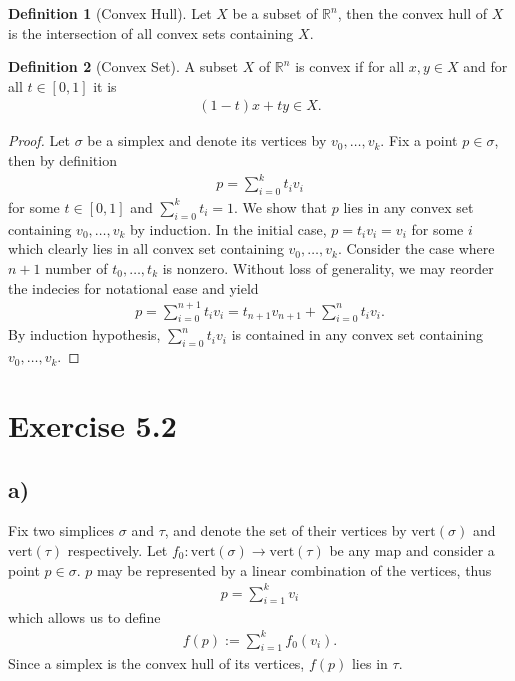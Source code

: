 \documentclass[a4paper]{book}
\theoremstyle{definition}
\newtheorem{definition}{Definition}[]
\begin{document}
\begin{definition}[Convex Hull]
    Let \(X\) be a subset of \(\mathbb{R}^n\), then the convex hull of \(X\) is the intersection of all convex sets containing \(X\).
\end{definition}

\begin{definition}[Convex Set]
    A subset \(X\) of \(\mathbb{R}^n\) is convex if for all \(x, y \in X\) and for all \(t \in [0, 1]\) it is
    \begin{align*}
        (1 - t)x + ty \in X \text{.}
    \end{align*}
\end{definition}

\begin{proof}
    Let \(\sigma\) be a simplex and denote its vertices by \(v_0, \ldots, v_k\). Fix a point \(p \in \sigma\), then by definition
    \begin{align*}
        p = \sum_{i=0}^k t_i v_i
    \end{align*}
    for some \(t \in [0, 1]\) and \(\sum_{i=0}^k t_i = 1\). We show that \(p\) lies in any convex set containing \(v_0, \ldots, v_k\) by induction. In the initial case, \(p = t_i v_i = v_i\) for some \(i\) which clearly lies in all convex set containing \(v_0, \ldots, v_k\). Consider the case where \(n + 1\) number of \(t_0, \ldots, t_k\) is nonzero. Without loss of generality, we may reorder the indecies for notational ease and yield
    \begin{align*}
        p = \sum_{i=0}^{n+1} t_i v_i = t_{n+1} v_{n+1} + \sum_{i=0}^{n} t_i v_i \text{.}
    \end{align*}
    By induction hypothesis, \(\sum_{i=0}^{n} t_i v_i\) is contained in any convex set containing \(v_0, \ldots, v_k\).
\end{proof}

\section*{Exercise 5.2}
\subsection*{a)}

Fix two simplices \(\sigma\) and \(\tau\), and denote the set of their vertices by \(\mathrm{vert}(\sigma)\) and \(\mathrm{vert}(\tau)\) respectively. Let \(f_0: \mathrm{vert}(\sigma) \longrightarrow \mathrm{vert}(\tau)\) be any map and consider a point \(p \in \sigma\). \(p\) may be represented by a linear combination of the vertices, thus
\begin{align*}
    p = \sum_{i=1}^k v_i
\end{align*}
which allows us to define
\begin{align*}
    f(p) := \sum_{i=1}^k f_0(v_i) \text{.}
\end{align*}
Since a simplex is the convex hull of its vertices, \(f(p)\) lies in \(\tau\).
\end{document}
